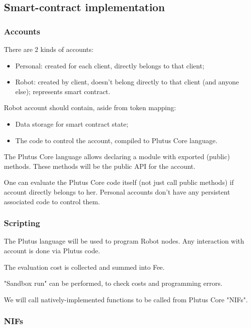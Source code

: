\subsection{Smart-contract implementation}


\subsubsection{Accounts}

There are 2 kinds of accounts:
\begin{itemize}
  \item Personal: created for each client, directly belongs to that client;
  \item Robot: created by client, doesn't belong directly to that client (and anyone else); represents smart contract.
\end{itemize}

Robot account should contain, aside from token mapping:
\begin{itemize}
  \item Data storage for smart contract state;
  \item The code to control the account, compiled to Plutus Core language.
\end{itemize}

The Plutus Core language allows declaring a module with exported (public) methods.
These methods will be the public API for the account.

One can evaluate the Plutus Core code itself (not just call public methods) if account directly belongs to her.
Personal accounts don't have any persistent associated code to control them.

\subsubsection{Scripting}

The Plutus language \cite{plutus} will be used to program Robot nodes.
Any interaction with account is done via Plutus code.

The evaluation cost is collected and summed into Fee.

"Sandbox run" can be performed, to check costs and programming errors.

We will call natively-implemented functions to be called from Plutus Core "NIFs".

\subsubsection{NIFs}

